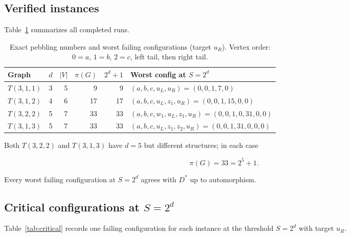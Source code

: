 \subsection{Verified instances}


Table~\ref{tab:results} summarizes all completed runs.


\begin{table}[ht]
\centering
\caption{Exact pebbling numbers and worst failing configurations
(target $u_R$). Vertex order: $0=a$, $1=b$, $2=c$, left tail,
then right tail.}
\label{tab:results}

\begin{tabular}{lrrrrl}
\hline
Graph & $d$ & $|V|$ & $\pi(G)$ & $2^d+1$ & Worst config at $S=2^d$ \\
\hline

$T(3,1,1)$
&3&5&9&9&
$(a,b,c,u_L,u_R)=(0,0,1,7,0)$ \\

$T(3,1,2)$
&4&6&17&17&
$(a,b,c,u_L,z_1,u_R)=(0,0,1,15,0,0)$ \\

$T(3,2,2)$
&5&7&33&33&
$(a,b,c,w_1,u_L,z_1,u_R)=(0,0,1,0,31,0,0)$ \\

$T(3,1,3)$
&5&7&33&33&
$(a,b,c,u_L,z_1,z_2,u_R)=(0,0,1,31,0,0,0)$ \\

\hline
\end{tabular}
\end{table}


Both $T(3,2,2)$ and $T(3,1,3)$ have $d=5$ but different structures;
in each case

\[
\pi(G)=33=2^5+1 .
\]

Every worst failing configuration at $S=2^d$ agrees with $D^*$ up to
automorphism.


\subsection{Critical configurations at \texorpdfstring{$S=2^d$}{S=2 to the d}}


Table~\ref{tab:critical} records one failing configuration for each instance
at the threshold $S=2^d$ with target $u_R$.


